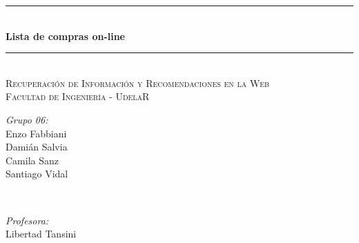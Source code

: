 \documentclass[12pt]{article} %
\begin{document}

\begin{titlepage}

\newcommand{\HRule}{\rule{\linewidth}{0.5mm}} %

\center %




\HRule \\[0.4cm]
{ \huge \bfseries Lista de compras on-line}\\[0.4cm] %
\HRule \\[1.5cm]
\textsc{\Large Recuperación de Información y Recomendaciones en la Web }\\[0.5cm] %
\textsc{\large Facultad de Ingeniería - UdelaR}\\[0.2cm] %

\par\vbox{}\null\vfill\nopagebreak

\begin{minipage}{0.4\textwidth}
\begin{flushleft} \large
\emph{Grupo 06:}\\
Enzo Fabbiani \\
Damián Salvia \\
Camila Sanz \\
Santiago Vidal
\end{flushleft}
\end{minipage}
~
\begin{minipage}{0.4\textwidth}
\begin{flushright} \large
\emph{Profesora:} \\
Libertad Tansini
\end{flushright}
\end{minipage}\\[4cm]




\end{titlepage}
\end{document}

